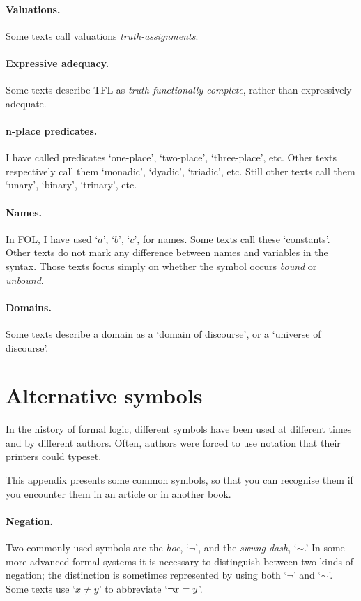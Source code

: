 \paragraph{Valuations.} Some texts call valuations \emph{truth-assignments}. 

\paragraph{Expressive adequacy.} Some texts describe TFL as \emph{truth-functionally complete}, rather than expressively adequate.

\paragraph{n-place predicates.} I have called predicates `one-place', `two-place', `three-place', etc. Other texts respectively call them `monadic', `dyadic', `triadic', etc. Still other texts call them `unary', `binary', `trinary', etc.

\paragraph{Names.} In FOL, I have used `$a$', `$b$', `$c$', for names. Some texts call these `constants'. Other texts do not mark any difference between names and variables in the syntax. Those texts focus simply on  whether the symbol occurs \emph{bound} or \emph{unbound}. 

\paragraph{Domains.} Some texts describe a domain as a `domain of discourse', or a `universe of discourse'.

\section{Alternative symbols}
In the history of formal logic, different symbols have been used at different times and by different authors. Often, authors were forced to use notation that their printers could typeset.

This appendix presents some common symbols, so that you can recognise them if you encounter them in an article or in another book.

\paragraph{Negation.} Two commonly used symbols are the \emph{hoe}, `$\neg$', and the \emph{swung dash}, `${\sim}$.' In some more advanced formal systems it is necessary to distinguish between two kinds of negation; the distinction is sometimes represented by using both `$\neg$' and `${\sim}$'. Some texts use `$x \neq y$' to abbreviate `$\neg x = y$'.

